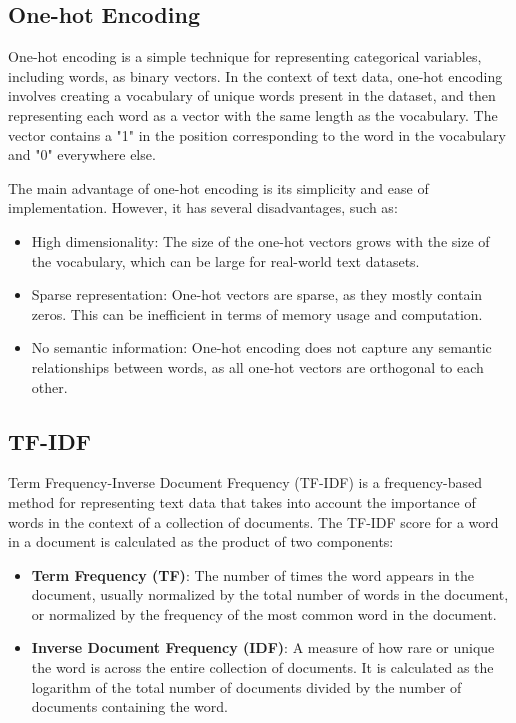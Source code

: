 \documentclass[12pt]{article}
\begin{document}
\subsection{One-hot Encoding}
One-hot encoding is a simple technique for representing categorical variables, including words, as binary vectors. In the context of text data, one-hot encoding involves creating a vocabulary of unique words present in the dataset, and then representing each word as a vector with the same length as the vocabulary. The vector contains a "1" in the position corresponding to the word in the vocabulary and "0" everywhere else.

The main advantage of one-hot encoding is its simplicity and ease of implementation. However, it has several disadvantages, such as:
\begin{itemize}
\item High dimensionality: The size of the one-hot vectors grows with the size of the vocabulary, which can be large for real-world text datasets.

\item Sparse representation: One-hot vectors are sparse, as they mostly contain zeros. This can be inefficient in terms of memory usage and computation.

\item No semantic information: One-hot encoding does not capture any semantic relationships between words, as all one-hot vectors are orthogonal to each other.
\end{itemize}

\subsection{TF-IDF}

Term Frequency-Inverse Document Frequency (TF-IDF) is a frequency-based method for representing text data that takes into account the importance of words in the context of a collection of documents. The TF-IDF score for a word in a document is calculated as the product of two components:

\begin{itemize}
\item {\textbf{Term Frequency (TF)}: The number of times the word appears in the document, usually normalized by the total number of words in the document, or normalized by the frequency of the most common word in the document. 
}
\item \textbf{Inverse Document Frequency (IDF)}{: A measure of how rare or unique the word is across the entire collection of documents. It is calculated as the logarithm of the total number of documents divided by the number of documents containing the word.}
\end{itemize}
\end{document}
